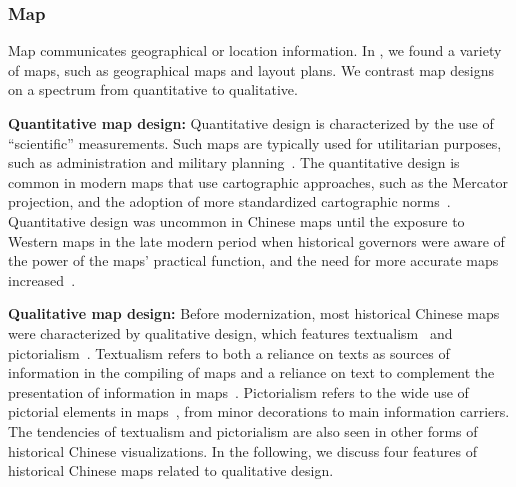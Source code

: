 \subsubsection{Map}


Map communicates geographical or location information.
In \datasetName, we found a variety of maps, such as geographical maps and layout plans.
We contrast map designs on a spectrum from quantitative to qualitative.

\textbf{Quantitative map design:}
Quantitative design is characterized by the use of  ``scientific'' measurements.
Such maps are typically used for utilitarian purposes, such as administration and military planning~\cite{Yee1994Reinterpreting}.
The quantitative design is common in modern maps that use cartographic approaches, such as the Mercator projection, and the adoption of more standardized cartographic norms~\cite{Yee1994Reinterpreting, Amelung2007New, Yee1994Traditional}.
Quantitative design was uncommon in Chinese maps until the exposure to Western maps in the late modern period when historical governors were aware of the power of the maps' practical function, and the need for more accurate maps increased~\cite{Amelung2007New}.

\textbf{Qualitative map design:}
Before modernization, most historical Chinese maps were characterized by qualitative design, which features textualism~\cite{Yee1994Taking, DorofeevaLichtmann2004Spatial} and pictorialism~\cite{Osawa2016Landscape, Yee1994Reinterpreting, Jiang2017heritage}.
Textualism refers to both a reliance on texts as sources of information in the compiling of maps and a reliance on text to complement the presentation of information in maps~\cite{Yee1994Taking}.
Pictorialism refers to the wide use of pictorial elements in maps~\cite{Osawa2016Landscape, Yee1994Reinterpreting, Jiang2017heritage}, from minor decorations to main information carriers.
The tendencies of textualism and pictorialism are also seen in other forms of historical Chinese visualizations.
In the following, we discuss four features of historical Chinese maps related to qualitative design.

